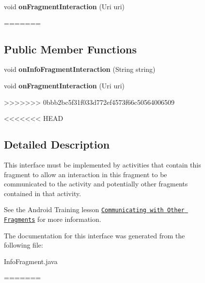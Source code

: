 \begin{figure}[H]
\begin{DoxyCompactItemize}
\item 
\hypertarget{interfacecom_1_1example_1_1sel_1_1lostfound_1_1InfoFragment_1_1OnFragmentInteractionListener_aaee7dd0f88da8e1ff9c1213285377017}{void {\bfseries on\-Fragment\-Interaction} (Uri uri)}\label{interfacecom_1_1example_1_1sel_1_1lostfound_1_1InfoFragment_1_1OnFragmentInteractionListener_aaee7dd0f88da8e1ff9c1213285377017}
=======
\subsection*{\-Public \-Member \-Functions}
\begin{DoxyCompactItemize}
\item 
\hypertarget{interfacecom_1_1example_1_1sel_1_1lostfound_1_1InfoFragment_1_1OnFragmentInteractionListener_a6aa219ac44d543de0564fc4d60ddb055}{void {\bfseries on\-Info\-Fragment\-Interaction} (\-String string)}\label{interfacecom_1_1example_1_1sel_1_1lostfound_1_1InfoFragment_1_1OnFragmentInteractionListener_a6aa219ac44d543de0564fc4d60ddb055}

\item 
\hypertarget{interfacecom_1_1example_1_1sel_1_1lostfound_1_1InfoFragment_1_1OnFragmentInteractionListener_aaee7dd0f88da8e1ff9c1213285377017}{void {\bfseries on\-Fragment\-Interaction} (\-Uri uri)}\label{interfacecom_1_1example_1_1sel_1_1lostfound_1_1InfoFragment_1_1OnFragmentInteractionListener_aaee7dd0f88da8e1ff9c1213285377017}
>>>>>>> 0bbb2bc5f31f033d772ef4573f66c50564006509

\end{DoxyCompactItemize}


<<<<<<< HEAD
\subsection{Detailed Description}
This interface must be implemented by activities that contain this fragment to allow an interaction in this fragment to be communicated to the activity and potentially other fragments contained in that activity. 

See the Android Training lesson \href{http://developer.android.com/training/basics/fragments/communicating.html}{\tt Communicating with Other Fragments} for more information. 

The documentation for this interface was generated from the following file\-:\begin{DoxyCompactItemize}
\item 
Info\-Fragment.\-java\end{DoxyCompactItemize}
=======

\end{DoxyCompactItemize}
\end{figure}
